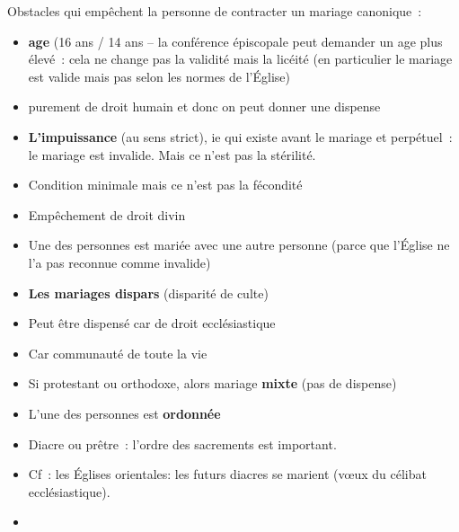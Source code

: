 Obstacles qui empêchent la personne de contracter un mariage canonique~:

\begin{itemize}
\item
  \textbf{age} (16 ans / 14 ans -- la conférence épiscopale peut
  demander un age plus élevé~: cela ne change pas la validité mais la
  licéité (en particulier le mariage est valide mais pas selon les
  normes de l'Église)
\item
   
  purement de droit humain et donc on peut donner une dispense
   
\item
  \textbf{L'impuissance} (au sens strict), ie qui existe avant le
  mariage et perpétuel~: le mariage est invalide. Mais ce n'est pas la
  stérilité.
\item
   
  Condition minimale mais ce n'est pas la fécondité
   
\item
   
  Empêchement de droit divin
   
\item
  Une des personnes est mariée avec une autre personne (parce que
  l'Église ne l'a pas reconnue comme invalide)
\item
  \textbf{Les mariages dispars} (disparité de culte)
\item
   
  Peut être dispensé car de droit ecclésiastique
   
\item
   
  Car communauté de toute la vie
   
\item
   
  Si protestant ou orthodoxe, alors mariage \textbf{mixte} (pas de
  dispense)
   
\item
  L'une des personnes est \textbf{ordonnée}
\item
   
  Diacre ou prêtre~: l'ordre des sacrements est important.
   
\item
   
  Cf~: les Églises orientales: les futurs diacres se marient (vœux du
  célibat ecclésiastique).
   
\item
   

\end{itemize}
